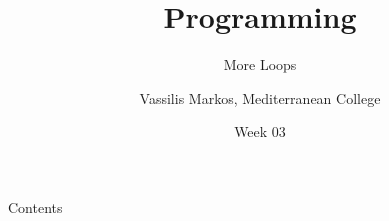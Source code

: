\documentclass[aspectratio=169, 12pt, xcolor=table]{beamer}
\title{Programming}
\subtitle{More Loops}
\date{Week 03}
\author{Vassilis Markos, Mediterranean College}
\newcommand{\ohref}[1]{\href{#1}{\texttt{#1}}}
\begin{document}
	\begin{frame}
		\titlepage
	\end{frame}

	\begin{frame}{Contents}
		\tableofcontents
	\end{frame}

%	
%	
%
\end{document}
